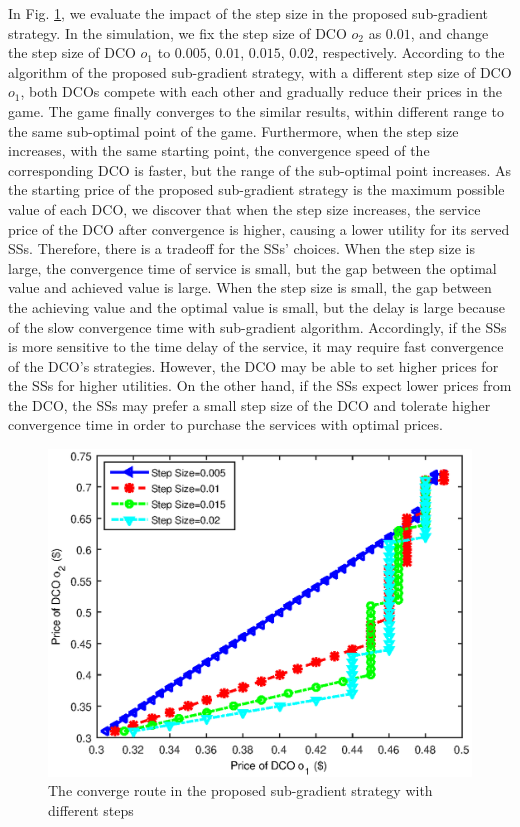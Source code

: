 \documentclass[twocolumn,10pt]{IEEEtran}
\begin{document}
In Fig. \ref{fig:step}, we evaluate the impact of the step size in the proposed sub-gradient strategy. In the simulation, we fix the step size of DCO $o_2$ as $0.01$, and change the step size of DCO $o_1$ to $0.005$, $0.01$, $0.015$, $0.02$, respectively. According to the algorithm of the proposed sub-gradient strategy, with a different step size of DCO $o_1$, both DCOs compete with each other and gradually reduce their prices in the game. The game finally converges to the similar results, within different range to the same sub-optimal point of the game. Furthermore, when the step size increases, with the same starting point, the convergence speed of the corresponding DCO is faster, but the range of the sub-optimal point increases. As the starting price of the proposed sub-gradient strategy is the maximum possible value of each DCO, we discover that when the step size increases, the service price of the DCO after convergence is higher, causing a lower utility for its served SSs. Therefore, there is a tradeoff for the SSs' choices. When the step size is large, the convergence time of service is small, but the gap between the optimal value and achieved value is large. When the step size is small, the gap between the achieving value and the optimal value is small, but the delay is large because of the slow convergence time with sub-gradient algorithm. Accordingly, if the SSs is more sensitive to the time delay of the service, it may require fast convergence of the DCO's strategies. However, the DCO may be able to set higher prices for the SSs for higher utilities. On the other hand, if the SSs expect lower prices from the DCO, the SSs may prefer a small step size of the DCO and tolerate higher convergence time in order to purchase the services with optimal prices.



\begin{figure}[!t]
\centering
\includegraphics[scale=0.45, bb=391 0 13 302]{fig_step_route.eps}
\caption{The converge route in the proposed sub-gradient strategy with different steps}
\label{fig:step}
\end{figure}
\end{document}
